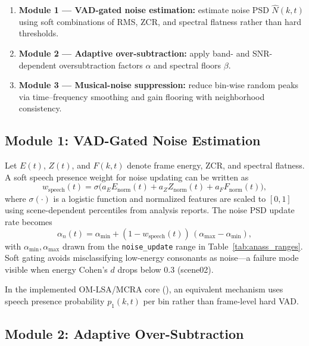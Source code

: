 \begin{definition}
  \label{def:anass}
  \begin{enumerate}
    \item \textbf{Module 1 --- VAD-gated noise estimation:} estimate noise PSD $\hat{N}(k,t)$ using soft combinations of RMS, ZCR, and spectral flatness rather than hard thresholds.
    \item \textbf{Module 2 --- Adaptive over-subtraction:} apply band- and SNR-dependent oversubtraction factors $\alpha$ and spectral floors $\beta$.
    \item \textbf{Module 3 --- Musical-noise suppression:} reduce bin-wise random peaks via time--frequency smoothing and gain flooring with neighborhood consistency.
  \end{enumerate}
\end{definition}

\subsection{Module 1: VAD-Gated Noise Estimation}

Let $E(t)$, $Z(t)$, and $F(k,t)$ denote frame energy, ZCR, and spectral flatness. A soft speech presence weight for noise updating can be written as
\begin{equation}
  w_{\mathrm{speech}}(t) = \sigma\!\bigl(a_E E_{\mathrm{norm}}(t) + a_Z Z_{\mathrm{norm}}(t) + a_F F_{\mathrm{norm}}(t)\bigr),
  \label{eq:soft_vad}
\end{equation}
where $\sigma(\cdot)$ is a logistic function and normalized features are scaled to $[0,1]$ using scene-dependent percentiles from analysis reports. The noise PSD update rate becomes
\begin{equation}
  \alpha_n(t) = \alpha_{\min} + (1-w_{\mathrm{speech}}(t))\,(\alpha_{\max}-\alpha_{\min}),
\end{equation}
with $\alpha_{\min}, \alpha_{\max}$ drawn from the \texttt{noise\_update} range in Table~\ref{tab:anass_ranges}. Soft gating avoids misclassifying low-energy consonants as noise---a failure mode visible when energy Cohen's $d$ drops below 0.3 (scene02).

In the implemented OM-LSA/MCRA core (), an equivalent mechanism uses speech presence probability $p_1(k,t)$ per bin rather than frame-level hard VAD.

\subsection{Module 2: Adaptive Over-Subtraction}

